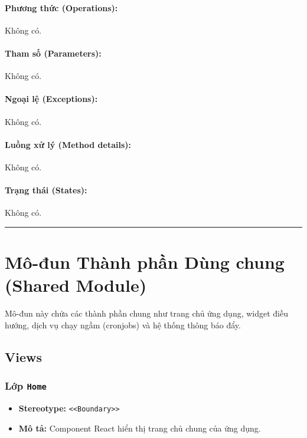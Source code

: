 \documentclass[12pt,a4paper]{article}
\begin{document}
\paragraph{Phương thức (Operations):}
Không có.

\paragraph{Tham số (Parameters):}
Không có.

\paragraph{Ngoại lệ (Exceptions):}
Không có.

\paragraph{Luồng xử lý (Method details):}
Không có.

\paragraph{Trạng thái (States):}
Không có.

\vskip 0.5cm
\noindent\rule{\textwidth}{0.5pt}
\vskip 0.5cm

\section{Mô-đun Thành phần Dùng chung (Shared Module)}

Mô-đun này chứa các thành phần chung như trang chủ ứng dụng, widget điều hướng, dịch vụ chạy ngầm (cronjobs) và hệ thống thông báo đẩy.

\subsection{Views}

\subsubsection{Lớp \texttt{Home}}
\begin{itemize}[leftmargin=*]
    \item \textbf{Stereotype:} \texttt{\textless{}\textless{}Boundary\textgreater{}\textgreater{}}
    \item \textbf{Mô tả:} Component React hiển thị trang chủ chung của ứng dụng.
\end{itemize}
\end{document}
